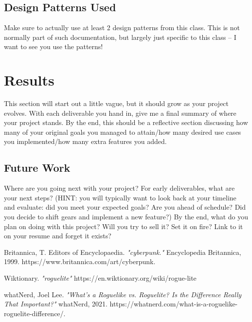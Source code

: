 \documentclass[10pt,conference,onecolumn,compsoc]{IEEEtran}
\begin{document}
\subsection{Design Patterns Used}
Make sure to actually use at least 2 design patterns from this class.  This is not normally part of such documentation, but largely just specific to this class -- I want to see you use the patterns!



\section{Results}
This section will start out a little vague, but it should grow as your project evolves.  With each deliverable you hand in, give me a final summary of where your project stands.  By the end, this should be a reflective section discussing how many of your original goals you managed to attain/how many desired use cases you implemented/how many extra features you added.

\subsection{Future Work}
Where are you going next with your project?
For early deliverables, what are your next steps?  (HINT: you will typically want to look back at your timeline and evaluate: did you meet your expected goals?  Are you ahead of schedule?  Did you decide to shift gears and implement a new feature?)
By the end, what do you plan on doing with this project?  Will you try to sell it?  Set it on fire?  Link to it on your resume and forget it exists?





\begin{thebibliography}{1}

Britannica, T. Editors of Encyclopaedia. \emph{"cyberpunk."} Encyclopedia Britannica, 1999. https://www.britannica.com/art/cyberpunk.

Wiktionary. \emph{"roguelite"}
https://en.wiktionary.org/wiki/rogue-lite

whatNerd, Joel Lee. \emph{"What’s a Roguelike vs. Roguelite? Is the Difference Really That Important?"} whatNerd, 2021. https://whatnerd.com/what-is-a-roguelike-roguelite-difference/.

\end{thebibliography}

\end{document}
